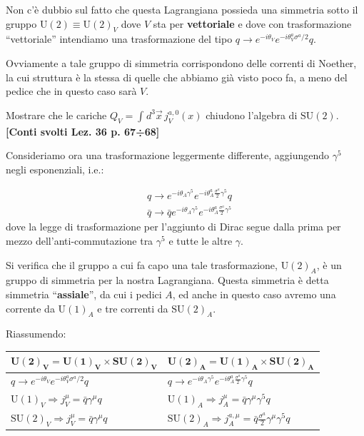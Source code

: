 \documentclass[../main.tex]{subfiles}
\begin{document}
Non c'è dubbio sul fatto che questa Lagrangiana possieda una simmetria sotto il gruppo $\textrm{U}(2) \equiv \textrm{U}(2)_V$ dove $V$ sta per \textbf{vettoriale} e dove con trasformazione “vettoriale” intendiamo una trasformazione del tipo
\(q \rightarrow e^{-i\theta_V}e^{-i\theta_V^a{\sigma^a}/{2}}q\).

Ovviamente a tale gruppo di simmetria corrispondono delle correnti di Noether, la cui struttura è la stessa di quelle che abbiamo già visto poco fa, a meno del pedice che in questo caso sarà $V$.

\begin{exercise}
    Mostrare che le cariche $Q_V = \int_{}d^3\Vec{x}\,j^{a,0}_V(x)$ chiudono l'algebra di $\textrm{SU}(2)$. \textbf{[Conti svolti Lez. 36 p. 67÷68]}
    \label{ex:QV_SU2_algebra}
\end{exercise}

Consideriamo ora una trasformazione leggermente differente, aggiungendo $\gamma^5$ negli esponenziali, i.e.: 

\[\boxed{\begin{aligned}
    &q \rightarrow e^{-i\theta_A\gamma^5}e^{-i\theta_A^a\frac{\sigma^a}{2}\gamma^5}q\\
    &\bar{q} \rightarrow \bar{q}e^{-i\theta_A\gamma^5}e^{-i\theta_A^a\frac{\sigma^a}{2}\gamma^5}
\end{aligned}}\]
dove la legge di trasformazione per l'aggiunto di Dirac segue dalla prima per mezzo dell'anti-commutazione tra $\gamma^5$ e tutte le altre $\gamma$.

Si verifica che il gruppo a cui fa capo una tale trasformazione, $\textrm{U}(2)_A$, è un gruppo di simmetria per la nostra Lagrangiana. Questa simmetria è detta simmetria “\textbf{assiale}”, da cui i pedici $A$, ed anche in questo caso avremo una corrente da $\textrm{U}(1)_A$ e tre correnti da $\textrm{SU}(2)_A$. 

Riassumendo:
\begin{center}
\begin{tabular}{l|l}
    $\mathbf{\textbf{U}(2)_V = \textbf{U}(1)_V \times \textbf{SU}(2)_V}$ & $\mathbf{\textbf{U}(2)_A = \textbf{U}(1)_A \times \textbf{SU}(2)_A}$ \\ \hline
    $q \rightarrow e^{-i\theta_V}e^{-i\theta_V^a{\sigma^a}/{2}}q$ &  $q \rightarrow e^{-i\theta_A\gamma^5}e^{-i\theta_A^a\frac{\sigma^a}{2}\gamma^5}q$ \\
    $\textrm{U}(1)_V  \Rightarrow j^\mu_V = \bar q \gamma^\mu q$    & $\textrm{U}(1)_A  \Rightarrow j^{\mu}_A = \bar q \gamma^\mu\gamma^5 q$   \\
    $\textrm{SU}(2)_V  \Rightarrow j^\mu_V = \bar q \gamma^\mu q$    & $\textrm{SU}(2)_A  \Rightarrow j^{a,\mu}_A = \bar q \frac{\sigma^a}{2}\gamma^\mu\gamma^5 q$ 
\end{tabular}
\end{center}
\end{document}

